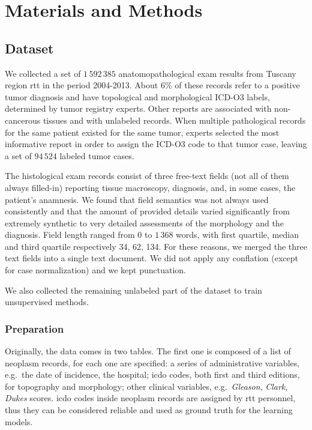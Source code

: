 \chapter{Materials and Methods}

\section{Dataset}
\label{sec:dataset}
We collected a set of $1\,592\,385$ anatomopathological exam results
from Tuscany region \ac{rtt} in the period 2004-2013. About $6\%$
of these records refer to a positive tumor
diagnosis and have topological and morphological ICD-O3 labels,
determined by tumor registry experts. Other reports are associated
with non-cancerous tissues and with unlabeled records. When multiple
pathological records for the
same patient existed for the same tumor, experts selected the most
informative report in order to assign the ICD-O3 code to that tumor
case, leaving a set of $94\,524$ labeled tumor cases.

The histological exam records consist of three free-text fields (not all
of them always filled-in) reporting tissue macroscopy, diagnosis,
and, in some cases, the patient's anamnesis. We found that field
semantics was not always used consistently and that the amount of
provided details varied significantly from extremely synthetic to very
detailed assessments of the morphology and the diagnosis. Field length
ranged from $0$ to $1\,368$ words, with first quartile, median and
third quartile respectively 34, 62, 134. For these reasons, we merged
the three text fields
into a single text document. We did not apply any conflation (except for
case normalization) and we kept punctuation.


We also collected the remaining unlabeled part of the dataset to train
unsupervised methods.

\subsection{Preparation}
Originally, the data
comes in two tables. The first one is composed of
a list of
neoplasm records, for each one are specified: a series of
administrative variables, e.g.\ the date of incidence, the hospital;
\ac{icdo} codes, both first and third editions, for topography and
morphology; other clinical variables, e.g.\ \emph{Gleason},
\emph{Clark}, \emph{Dukes} scores.
\ac{icdo} codes inside neoplasm records are assigned by
\ac{rtt} personnel, thus they can be considered reliable and used as
ground truth for the learning models.

